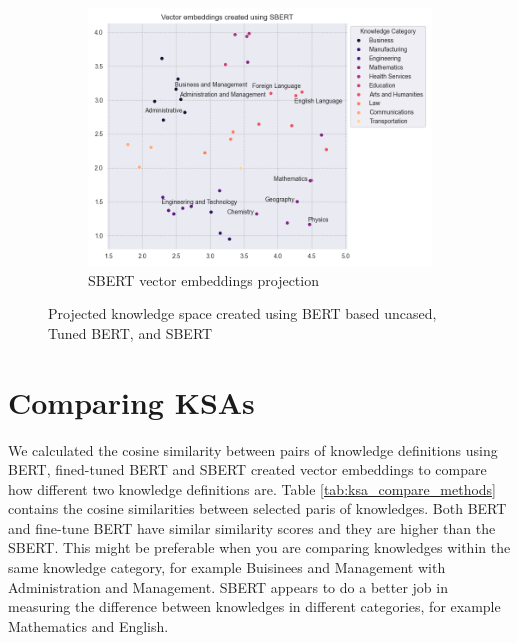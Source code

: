 \documentclass[12pt]{article}
\begin{document}
\begin{figure}
    \vspace{10pt} %
  
    \begin{subfigure}{0.45\textwidth}
      \centering
      \includegraphics[width=\linewidth]{../plots/base_sbert.png}
      \caption{SBERT vector embeddings projection}
      \label{fig:ksa_space_sbert}
    \end{subfigure}
  
    \caption{Projected knowledge space created using BERT based uncased, Tuned BERT, and SBERT}
    \label{fig:ksa_space}

\end{figure}

\section{Comparing KSAs}

We calculated the cosine similarity between pairs of knowledge definitions using BERT, fined-tuned BERT and SBERT created vector embeddings to compare how different two knowledge definitions are. Table \ref{tab:ksa_compare_methods} contains the cosine similarities between selected paris of knowledges. Both BERT and fine-tune BERT have similar similarity scores and they are higher than the SBERT. This might be preferable when you are comparing knowledges within the same knowledge category, for example Buisinees and Management with Administration and Management. SBERT appears to do a better job in measuring the difference between knowledges in different categories, for example Mathematics and English.\\
\end{document}
